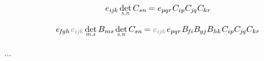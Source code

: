 \[
e_{i\hspace{-0.1ex}j\hspace{-0.1ex}k} \hspace{.33ex} \determinantby{s}{\hspace{.1ex}n} \, C_{sn} \hspace{-0.2ex}
= e_{pqr} \hspace{.1ex} C_{ip} C_{\hspace{-0.1ex}j\hspace{-0.1ex}q} C_{kr}
\hspace{-0.2ex}
\]

\[
e_{\hspace{-0.25ex}f\hspace{-0.2ex}gh} \hspace{.2ex} \mathcolor{black!50}{e_{i\hspace{-0.1ex}j\hspace{-0.1ex}k}} \hspace{.33ex} \determinantby{m}{s} \, \somematrixelements{ms} \hspace{.33ex} \determinantby{s}{\hspace{.1ex}n} \, C_{sn} \hspace{-0.2ex}
= \mathcolor{black!50}{e_{i\hspace{-0.1ex}j\hspace{-0.1ex}k}} \hspace{.2ex} e_{pqr} \hspace{.1ex} \somematrixelements{\hspace{-0.25ex}f\hspace{-0.1ex}i} \somematrixelements{\hspace{-0.1ex}gj} \somematrixelements{hk} \hspace{.1ex} C_{ip} C_{\hspace{-0.1ex}j\hspace{-0.1ex}q} C_{kr}
\hspace{-0.2ex}
\]

...


